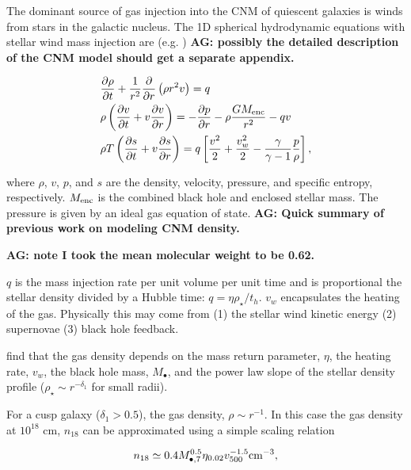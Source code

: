 \documentclass[usenatbib,fleqn]{mnras}
\newcommand{\Mbh}[1][]{M_{\bullet#1}}
\newcommand{\Menc}{M_{\rm enc}}
\renewcommand{\th}{t_h}
\begin{document}
The dominant source of gas injection into the CNM of quiescent
galaxies is winds from stars in the galactic nucleus. The 1D spherical
hydrodynamic equations with stellar wind mass injection are
(e.g. \citealt{Holzer+1970}) {\bf AG: possibly the detailed
  description of the CNM model should get a separate appendix.}


\begin{align}
  &\frac{\partial \rho}{\partial t}+\frac{1}{r^2}\frac{\partial}{\partial r}\left(\rho r^2 v\right)=q \label{eq:drhodt}\\
  &\rho \left(\frac{\partial v}{\partial t} + v\frac{\partial
      v}{\partial r}\right) =-\frac{\partial p}{\partial r}- \rho\frac{GM_{\rm enc}}{r^{2}} -q v \label{eq:dvdt}\\
  &\rho T\left(\frac{\partial s}{\partial t} + v\frac{\partial
      s}{\partial
      r}\right)=q\left[\frac{v^2}{2}+\frac{v_w^2}{2}-\frac{\gamma}{\gamma-1}
    \frac{p}{\rho} \right] ,
\label{eq:dsdt}
\end{align}

where $\rho$, $v$, $p$, and $s$ are the density, velocity, pressure, and
specific entropy, respectively.  $\Menc$ is the combined black hole
and enclosed stellar mass. The pressure is given by an ideal gas
equation of state.  {\bf AG: Quick summary of previous work on
  modeling CNM density.}

 {\bf AG: note I took the mean molecular weight to be
  0.62.}

$q$ is the mass injection rate per unit volume per unit time and is
proportional the stellar density divided by a Hubble time: $q=\eta
\rho_\star/\th$. $v_w$ encapsulates the heating of the gas. Physically
this may come from (1) the stellar wind kinetic energy (2) supernovae
(3) black hole feedback.

\citet{Generozov+2015} find that the gas density depends on the
mass return parameter, $\eta$, the heating rate, $v_w$, the black hole
mass, $\Mbh$, and the power law slope of the stellar density profile
($\rho_\star\sim r^{-\delta_1}$ for small radii).

For a cusp galaxy ($\delta_1> 0.5$), the gas density, $\rho\sim
r^{-1}$. In this case the gas density at $10^{18}$ cm, $n_{18}$ can be
approximated using a simple scaling relation 

\begin{equation}
n_{18}\simeq 0.4 \Mbh[,7]^{0.5} \eta_{0.02} v_{500}^{-1.5} {\rm
  cm^{-3}},
\label{eq:n18}
\end{equation}
\end{document}
